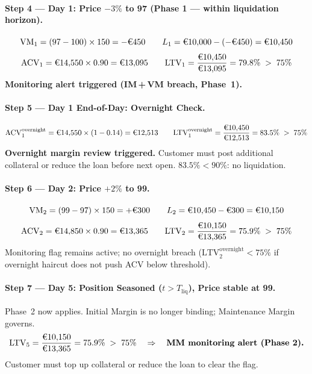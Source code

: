 \documentclass[9pt, a4paper]{extarticle}
\newcommand{\EUR}[1]{\ifmmode\text{\texteuro}#1\else\texteuro#1\fi}
\begin{document}
\paragraph{Step 4 — Day 1: Price $-3\%$ to \EUR{97} \textnormal{(Phase 1 — within liquidation horizon)}.}
\[
    \mathrm{VM}_1 = (97 - 100) \times 150 = -\EUR{450}
    \qquad
    L_1 = \EUR{10{,}000} - (-\EUR{450}) = \EUR{10{,}450}
\]
\[
    \mathrm{ACV}_1 = \EUR{14{,}550} \times 0.90 = \EUR{13{,}095}
    \qquad
    \mathrm{LTV}_1 = \frac{\EUR{10{,}450}}{\EUR{13{,}095}} = 79.8\%
    \;>\; 75\%
\]
\textbf{Monitoring alert triggered (IM\,+\,VM breach, Phase~1).}

\paragraph{Step 5 — Day 1 End-of-Day: Overnight Check.}
\[
    \mathrm{ACV}_1^{\text{overnight}} = \EUR{14{,}550} \times (1 - 0.14) = \EUR{12{,}513}
    \qquad
    \mathrm{LTV}_1^{\text{overnight}} = \frac{\EUR{10{,}450}}{\EUR{12{,}513}} = 83.5\%
    \;>\; 75\%
\]
\textbf{Overnight margin review triggered.} Customer must post additional collateral
or reduce the loan before next open. $83.5\% < 90\%$: no liquidation.

\paragraph{Step 6 — Day 2: Price $+2\%$ to \EUR{99}.}
\[
    \mathrm{VM}_2 = (99 - 97) \times 150 = +\EUR{300}
    \qquad
    L_2 = \EUR{10{,}450} - \EUR{300} = \EUR{10{,}150}
\]
\[
    \mathrm{ACV}_2 = \EUR{14{,}850} \times 0.90 = \EUR{13{,}365}
    \qquad
    \mathrm{LTV}_2 = \frac{\EUR{10{,}150}}{\EUR{13{,}365}} = 75.9\%
    \;>\; 75\%
\]
Monitoring flag remains active; no overnight breach ($\mathrm{LTV}^{\text{overnight}}_2 < 75\%$ if
overnight haircut does not push ACV below threshold).

\paragraph{Step 7 — Day 5: Position Seasoned ($t > T_{\text{liq}}$), Price stable at \EUR{99}.}
Phase~2 now applies. Initial Margin is no longer binding; Maintenance Margin governs.
\[
    \mathrm{LTV}_5 = \frac{\EUR{10{,}150}}{\EUR{13{,}365}} = 75.9\%
    \;>\; 75\%
    \quad\Rightarrow\quad \textbf{MM monitoring alert (Phase~2).}
\]
Customer must top up collateral or reduce the loan to clear the flag.

\bigskip
\end{document}
